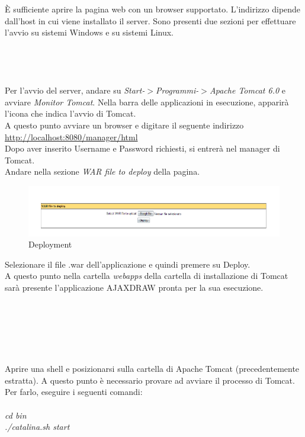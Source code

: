 \`E sufficiente aprire la pagina web con un browser supportato. L'indirizzo dipende dall'host in cui viene installato il server.
Sono presenti due sezioni per effettuare l'avvio su sistemi Windows e su sistemi Linux.\\
\\\\
\\
\\
Per l'avvio del server, andare su \textit{Start-$ > $Programmi-$ > $Apache Tomcat 6.0} e avviare \textit{Monitor Tomcat}.
Nella barra delle applicazioni in esecuzione, apparir\`a l'icona che indica l'avvio di Tomcat.\\
A questo punto avviare un browser e digitare il seguente indirizzo\\ \href{http://localhost:8080/manager/html}{http://localhost:8080/manager/html}\\
Dopo aver inserito Username e Password richiesti, si entrer\`a nel manager di Tomcat.\\
Andare nella sezione \textit{WAR file to deploy} della pagina.\\

\begin{figure}[!ht]
\centering
\includegraphics[scale=0.7]{images/DeployTomcat.png}
\caption{Deployment}
\end{figure} 

Selezionare il file .war dell'applicazione e quindi premere su Deploy.\\
A questo punto nella cartella \textit{webapps} della cartella di installazione di Tomcat sar\`a presente l'applicazione AJAXDRAW pronta per la sua esecuzione.\\
\\\\
\\\\
\\
\\
Aprire una shell e posizionarsi sulla cartella di Apache Tomcat (precedentemente estratta).
A questo punto \`e necessario provare ad avviare il processo di Tomcat. Per farlo, eseguire i seguenti comandi:\\
\\
\textit{cd bin}\\
\textit{./catalina.sh start}\\

